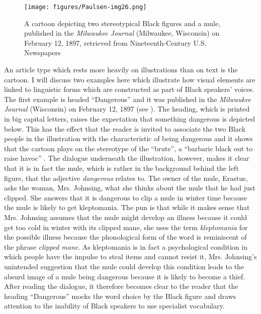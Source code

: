 \begin{figure}[b]
\texttt{[image: figures/Paulsen-img26.png]}
\caption{
A cartoon depicting two stereotypical Black figures and a mule, published in the \emph{Milwaukee Journal} (Milwaukee, Wisconsin) on February 12, 1897, retrieved from Nineteenth-Century U.S. Newspapers
}
\label{fig:key:26}
\end{figure}


An article type which rests more heavily on illustrations than on text is the cartoon. I will discuss two examples here which illustrate how visual elements are linked to linguistic forms which are constructed as part of Black speakers’ voices. The first example is headed “Dangerous” and it was published in the \emph{Milwaukee Journal} (Wisconsin) on February 12, 1897 (see ). The heading, which is printed in big capital letters, raises the expectation that something dangerous is depicted below. This has the effect that the reader is invited to associate the two Black people in the illustration with the characteristic of being dangerous and it shows that the cartoon plays on the stereotype of the “brute”, a “barbaric black out to raise havoc” \citep[13]{Bogle1990}. The dialogue underneath the illustration, however, makes it clear that it is in fact the mule, which is rather in the background behind the left figure, that the adjective \emph{dangerous} relates to. The owner of the mule, Erastus, asks the woman, Mrs. Johnsing, what she thinks about the mule that he had just clipped. She answers that it is dangerous to clip a mule in winter time because the mule is likely to get kleptomania. The pun is that while it makes sense that Mrs. Johnsing assumes that the mule might develop an illness because it could get too cold in winter with its clipped mane, she uses the term \emph{kleptomania} for the possible illness because the phonological form of the word is reminiscent of the phrase \emph{clipped mane}. As kleptomania is in fact a psychological condition in which people have the impulse to steal items and cannot resist it, Mrs. Johnsing’s unintended suggestion that the mule could develop this condition leads to the absurd image of a mule being dangerous because it is likely to become a thief. After reading the dialogue, it therefore becomes clear to the reader that the heading “Dangerous” mocks the word choice by the Black figure and draws attention to the inability of Black speakers to use specialist vocabulary.

